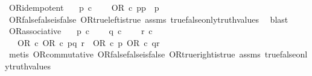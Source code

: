 \begin{isabellebody}
\isanewline
%
\endisadelimproof
\isanewline
{}\isamarkupfalse%
\ OR{\isacharunderscore}{\kern0pt}idempotent{\isacharcolon}{\kern0pt}\isanewline
\ \ \ {\isachardoublequoteopen}p\ {\isasymin}\isactrlsub c\ {\isasymOmega}{\isachardoublequoteclose}\isanewline
\ \ \ {\isachardoublequoteopen}OR\ {\isasymcirc}\isactrlsub c\ {\isasymlangle}p{\isacharcomma}{\kern0pt}p{\isasymrangle}\ {\isacharequal}{\kern0pt}\ p{\isachardoublequoteclose}\isanewline
%
\isadelimproof
\ \ %
\endisadelimproof
%
\isatagproof
{}\isamarkupfalse%
\ OR{\isacharunderscore}{\kern0pt}false{\isacharunderscore}{\kern0pt}false{\isacharunderscore}{\kern0pt}is{\isacharunderscore}{\kern0pt}false\ OR{\isacharunderscore}{\kern0pt}true{\isacharunderscore}{\kern0pt}left{\isacharunderscore}{\kern0pt}is{\isacharunderscore}{\kern0pt}true\ assms\ true{\isacharunderscore}{\kern0pt}false{\isacharunderscore}{\kern0pt}only{\isacharunderscore}{\kern0pt}truth{\isacharunderscore}{\kern0pt}values\ \isamarkupfalse%
\ blast%
\endisatagproof
{\isafoldproof}%
%
\isadelimproof
\isanewline
%
\endisadelimproof
\isanewline
{}\isamarkupfalse%
\ OR{\isacharunderscore}{\kern0pt}associative{\isacharcolon}{\kern0pt}\isanewline
\ \ \ {\isachardoublequoteopen}p\ {\isasymin}\isactrlsub c\ {\isasymOmega}{\isachardoublequoteclose}\isanewline
\ \ \ {\isachardoublequoteopen}q\ {\isasymin}\isactrlsub c\ {\isasymOmega}{\isachardoublequoteclose}\isanewline
\ \ \ {\isachardoublequoteopen}r\ {\isasymin}\isactrlsub c\ {\isasymOmega}{\isachardoublequoteclose}\isanewline
\ \ \ {\isachardoublequoteopen}OR\ {\isasymcirc}\isactrlsub c\ {\isasymlangle}OR\ {\isasymcirc}\isactrlsub c\ {\isasymlangle}p{\isacharcomma}{\kern0pt}q{\isasymrangle}{\isacharcomma}{\kern0pt}\ r{\isasymrangle}\ {\isacharequal}{\kern0pt}\ OR\ {\isasymcirc}\isactrlsub c\ {\isasymlangle}p{\isacharcomma}{\kern0pt}\ OR\ {\isasymcirc}\isactrlsub c\ {\isasymlangle}q{\isacharcomma}{\kern0pt}r{\isasymrangle}{\isasymrangle}{\isachardoublequoteclose}\isanewline
%
\isadelimproof
\ \ %
\endisadelimproof
%
\isatagproof
{}\isamarkupfalse%
\ {\isacharparenleft}{\kern0pt}metis\ OR{\isacharunderscore}{\kern0pt}commutative\ OR{\isacharunderscore}{\kern0pt}false{\isacharunderscore}{\kern0pt}false{\isacharunderscore}{\kern0pt}is{\isacharunderscore}{\kern0pt}false\ OR{\isacharunderscore}{\kern0pt}true{\isacharunderscore}{\kern0pt}right{\isacharunderscore}{\kern0pt}is{\isacharunderscore}{\kern0pt}true\ assms\ true{\isacharunderscore}{\kern0pt}false{\isacharunderscore}{\kern0pt}only{\isacharunderscore}{\kern0pt}truth{\isacharunderscore}{\kern0pt}values{\isacharparenright}{\kern0pt}%

\end{isabellebody}
